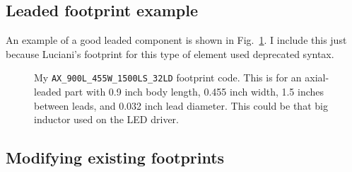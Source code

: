 \subsection{Leaded footprint example}
An example of a good leaded component is shown in Fig.\ \ref{leaded_example}.  I include this just because Luciani's footprint for this type of element used deprecated syntax.
\begin{figure}[ht]
	\begin{center}
		\begin{minipage}{10cm}
			
		\end{minipage}
		\caption{My \texttt{AX\_900L\_455W\_1500LS\_32LD} footprint code.  This is for an axial-leaded part with 0.9 inch body length, 0.455 inch width, 1.5 inches between leads, and 0.032 inch lead diameter.  This could be that big inductor used on the LED driver.\label{leaded_example}}
	\end{center} 
\end{figure}

\clearpage
\subsection{Modifying existing footprints}

